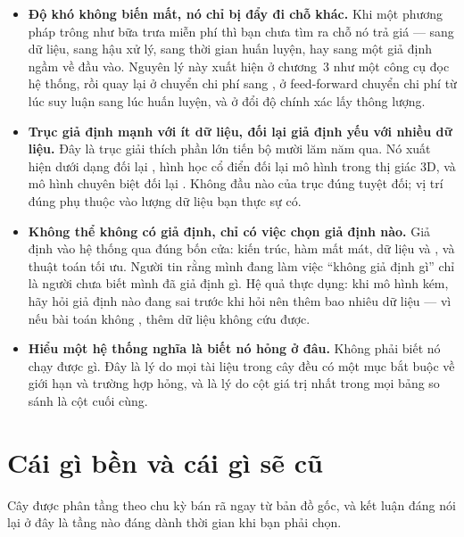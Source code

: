 \documentclass[deep_learning.tex]{subfiles}
\begin{document}
\begin{itemize}
\item \textbf{Độ khó không biến mất, nó chỉ bị đẩy đi chỗ khác.} Khi một phương pháp trông như bữa trưa miễn phí thì bạn chưa tìm ra chỗ nó trả giá --- sang dữ liệu, sang hậu xử lý, sang thời gian huấn luyện, hay sang một giả định ngầm về đầu vào. Nguyên lý này xuất hiện ở chương~3 như một công cụ đọc hệ thống, rồi quay lại ở  chuyển chi phí sang , ở  feed-forward chuyển chi phí từ lúc suy luận sang lúc huấn luyện, và ở  đổi độ chính xác lấy thông lượng.

\item \textbf{Trục giả định mạnh với ít dữ liệu, đối lại giả định yếu với nhiều dữ liệu.} Đây là trục giải thích phần lớn tiến bộ mười lăm năm qua. Nó xuất hiện dưới dạng  đối lại , hình học cổ điển đối lại mô hình  trong thị giác 3D, và mô hình chuyên biệt đối lại . Không đầu nào của trục đúng tuyệt đối; vị trí đúng phụ thuộc vào lượng dữ liệu bạn thực sự có.

\item \textbf{Không thể không có giả định, chỉ có việc chọn giả định nào.} Giả định vào hệ thống qua đúng bốn cửa: kiến trúc, hàm mất mát, dữ liệu và , và thuật toán tối ưu. Người tin rằng mình đang làm việc ``không giả định gì'' chỉ là người chưa biết mình đã giả định gì. Hệ quả thực dụng: khi mô hình kém, hãy hỏi giả định nào đang sai trước khi hỏi nên thêm bao nhiêu dữ liệu --- vì nếu bài toán không , thêm dữ liệu không cứu được.

\item \textbf{Hiểu một hệ thống nghĩa là biết nó hỏng ở đâu.} Không phải biết nó chạy được gì. Đây là lý do mọi tài liệu trong cây đều có một mục bắt buộc về giới hạn và trường hợp hỏng, và là lý do cột giá trị nhất trong mọi bảng so sánh là cột cuối cùng.
\end{itemize}

\section{Cái gì bền và cái gì sẽ cũ}

Cây được phân tầng theo chu kỳ bán rã ngay từ bản đồ gốc, và kết luận đáng nói lại ở đây là tầng nào đáng dành thời gian khi bạn phải chọn.
\end{document}
